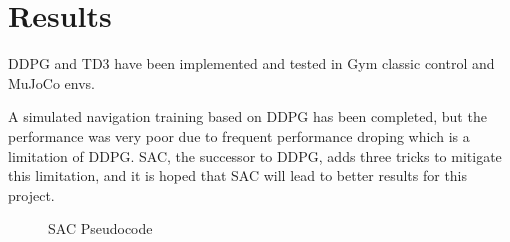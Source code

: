 \newpage
\section{Results}

DDPG and TD3 have been implemented and tested in Gym classic control and MuJoCo envs.

A simulated navigation training based on DDPG has been completed, but the performance was very poor due to frequent performance droping which is a limitation of DDPG. SAC, the successor to DDPG, adds three tricks to mitigate this limitation, and it is hoped that SAC will lead to better results for this project.

\begin{figure}[htbp]
   \centering
   
   \caption{SAC Pseudocode \cite{SpinningUp2018}}
   \label{fig:sac-pseudocode}
\end{figure}

